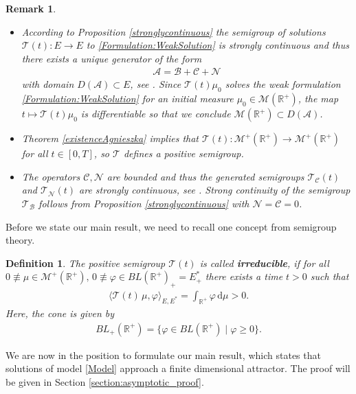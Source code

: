 \documentclass[12pt,a4paper]{amsart}
\newcommand{\ud}{\mathrm{d}}
\newtheorem{definition}[theorem]{Definition}
\newtheorem{remark}[theorem]{Remark}
\renewcommand{\phi}{\varphi}
\newcommand{\R}{\mathbb{R}}
\begin{document}
\noindent
\begin{remark}
\begin{itemize}
    \item [i)]
According to Proposition \ref{stronglycontinuous} the semigroup of solutions $\mathcal{T}(t):E\to E$ to \eqref{Formulation:WeakSolution} is strongly continuous and thus there exists a unique generator of the form 
    \begin{align*}
    \mathcal{A}=\mathcal{B}+\mathcal{C}+\mathcal{N}
    \end{align*}
with domain $D(\mathcal{A})\subset E$, see \cite[Thm 1.4, Chapter II]{EngelNagel}. Since $\mathcal{T}(t)\mu_0$ solves the weak formulation \eqref{Formulation:WeakSolution} for an initial measure $\mu_0\in \mathcal{M}(\R^+)$, the map $t\mapsto \mathcal{T}(t)\mu_0$ is differentiable so that we conclude $\mathcal{M}(\R^+)\subset D(\mathcal{A})$. 
\item [ii)]  \label{rem:positivity} Theorem \ref{existenceAgnieszka} implies that $\mathcal{T}(t):\mathcal{M}^+(\R^+)\to \mathcal{M}^+(\R^+)$ for all $t\in [0,T]$, so  $\mathcal{T}$ defines a positive semigroup.
\item [iii)] The operators $\mathcal{C},\mathcal{N}$ are bounded and thus the generated semigroups $\mathcal{T}_{\mathcal{C}}(t)$ and $\mathcal{T}_{\mathcal{N}}(t)$ are strongly continuous, see \cite[Prop. 3.5., Chapter I]{EngelNagel}. Strong continuity of the semigroup $\mathcal{T}_{\mathcal{B}}$ follows from Proposition \ref{stronglycontinuous} with $\mathcal{N}=\mathcal{C}=0$.
\end{itemize}
\end{remark}

\noindent Before we state our main result, we need to recall one concept from semigroup theory.
\begin{definition}\label{irr}
The positive semigroup $\mathcal{T}(t)$ is called \textbf{irreducible}, if for all $0\not\equiv \mu\in \mathcal{M}^+(\R^+),\,0\not\equiv \varphi\in BL(\R^+)_+=E^*_+$ there exists a time $t>0$ such that 
    \begin{align*}
       \langle\mathcal{T}(t)\,\mu,\varphi\rangle_{E,E^*}= \int_{\R^+}\phi\,\ud \mu>0. 
    \end{align*}
Here, the cone is given by
    \begin{align*}
    BL_+(\R^+)=\{\varphi\in BL(\R^+)\mid \varphi\geq 0\}.
    \end{align*}
\end{definition} 

\noindent We are now in the position to formulate our main result, which states that solutions of model \eqref{Model} approach a finite dimensional attractor.  The proof will be given in Section \ref{section:asymptotic_proof}.
\end{document}
